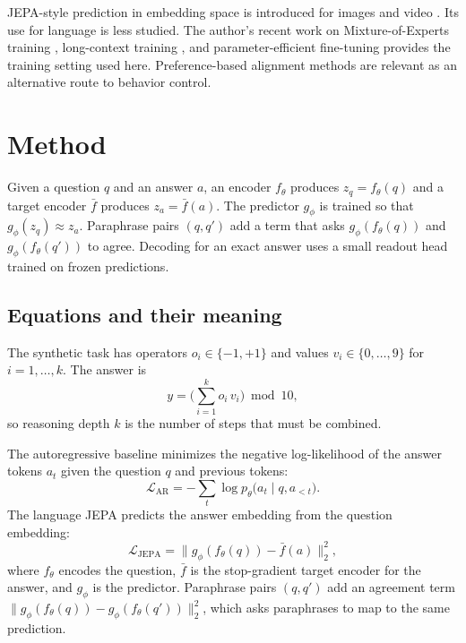 \documentclass[conference]{IEEEtran}
\begin{document}
JEPA-style prediction in embedding space is introduced for images and video \cite{bardes2024vjepa}. Its use for language is less studied. The author's recent work on Mixture-of-Experts training \cite{d9moe}, long-context training \cite{d6longcontext}, and parameter-efficient fine-tuning \cite{d10peft} provides the training setting used here. Preference-based alignment methods \cite{d7rlaif} are relevant as an alternative route to behavior control.

\section{Method}
Given a question $q$ and an answer $a$, an encoder $f_\theta$ produces $z_q = f_\theta(q)$ and a target encoder $\bar{f}$ produces $z_a = \bar{f}(a)$. The predictor $g_\phi$ is trained so that $g_\phi(z_q) \approx z_a$. Paraphrase pairs $(q, q')$ add a term that asks $g_\phi(f_\theta(q))$ and $g_\phi(f_\theta(q'))$ to agree. Decoding for an exact answer uses a small readout head trained on frozen predictions.

\subsection*{Equations and their meaning}
The synthetic task has operators $o_i\in\{-1,+1\}$ and values $v_i\in\{0,\dots,9\}$ for $i=1,\dots,k$. The answer is
\begin{equation}
y=\Big(\sum_{i=1}^{k}o_i\,v_i\Big)\bmod 10,
\end{equation}
so reasoning depth $k$ is the number of steps that must be combined.

The autoregressive baseline minimizes the negative log-likelihood of the answer tokens $a_t$ given the question $q$ and previous tokens:
\begin{equation}
\mathcal{L}_{\mathrm{AR}}=-\sum_{t}\log p_\theta\big(a_t\mid q,a_{<t}\big).
\end{equation}
The language JEPA predicts the answer embedding from the question embedding:
\begin{equation}
\mathcal{L}_{\mathrm{JEPA}}=\big\lVert g_\phi(f_\theta(q))-\bar f(a)\big\rVert_2^2,
\end{equation}
where $f_\theta$ encodes the question, $\bar f$ is the stop-gradient target encoder for the answer, and $g_\phi$ is the predictor. Paraphrase pairs $(q,q')$ add an agreement term $\lVert g_\phi(f_\theta(q))-g_\phi(f_\theta(q')) \rVert_2^2$, which asks paraphrases to map to the same prediction.
\end{document}
